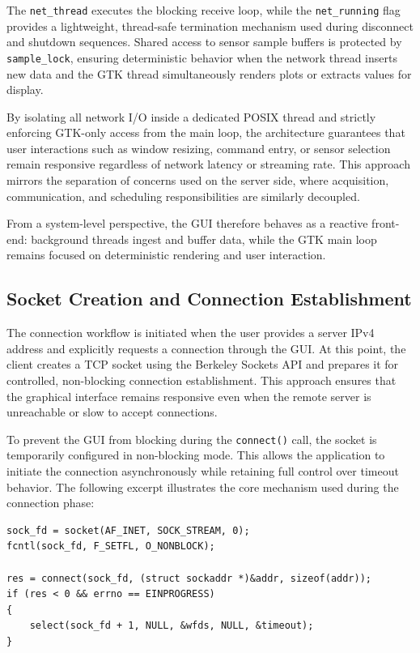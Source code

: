 The \texttt{net\_thread} executes the blocking receive loop, while the \texttt{net\_running} flag provides a lightweight, thread-safe termination mechanism used during disconnect and shutdown sequences. Shared access to sensor sample buffers is protected by \texttt{sample\_lock}, ensuring deterministic behavior when the network thread inserts new data and the GTK thread simultaneously renders plots or extracts values for display.

By isolating all network I/O inside a dedicated POSIX thread and strictly enforcing GTK-only access from the main loop, the architecture guarantees that user interactions such as window resizing, command entry, or sensor selection remain responsive regardless of network latency or streaming rate. This approach mirrors the separation of concerns used on the server side, where acquisition, communication, and scheduling responsibilities are similarly decoupled.

From a system-level perspective, the GUI therefore behaves as a reactive front-end: background threads ingest and buffer data, while the GTK main loop remains focused on deterministic rendering and user interaction.


\subsection{Socket Creation and Connection Establishment}
The connection workflow is initiated when the user provides a server IPv4 address and explicitly requests a connection through the GUI. At this point, the client creates a TCP socket using the Berkeley Sockets API and prepares it for controlled, non-blocking connection establishment. This approach ensures that the graphical interface remains responsive even when the remote server is unreachable or slow to accept connections.

To prevent the GUI from blocking during the \texttt{connect()} call, the
socket is temporarily configured in non-blocking mode. This allows the
application to initiate the connection asynchronously while retaining full
control over timeout behavior. The following excerpt illustrates the core
mechanism used during the connection phase:


\begin{verbatim}
sock_fd = socket(AF_INET, SOCK_STREAM, 0);
fcntl(sock_fd, F_SETFL, O_NONBLOCK);

res = connect(sock_fd, (struct sockaddr *)&addr, sizeof(addr));
if (res < 0 && errno == EINPROGRESS)
{
    select(sock_fd + 1, NULL, &wfds, NULL, &timeout);
}
\end{verbatim}

